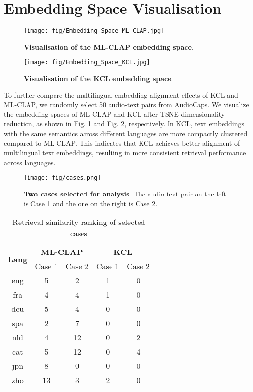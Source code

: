 \section{Embedding Space Visualisation}
\label{Appe:Embedding Space}
\begin{figure}[htbp]
    \centering
    \texttt{[image: fig/Embedding\_Space\_ML-CLAP.jpg]}
    \caption{\textbf{Visualisation of the ML-CLAP embedding space}.}
    \label{Fig:Embedding Space ML-CLAP}
\end{figure}

\begin{figure}[htbp]
    \centering
    \texttt{[image: fig/Embedding\_Space\_KCL.jpg]}
    \caption{\textbf{Visualisation of the KCL embedding space}.}
    \label{Fig:Embedding Space KCL}
\end{figure}

To further compare the multilingual embedding alignment effects of KCL and ML-CLAP, we randomly select 50 audio-text pairs from AudioCaps. We visualize the embedding spaces of ML-CLAP and KCL after TSNE dimensionality reduction, as shown in Fig. \ref{Fig:Embedding Space ML-CLAP} and Fig. \ref{Fig:Embedding Space KCL}, respectively. In KCL, text embeddings with the same semantics across different languages are more compactly clustered compared to ML-CLAP. This indicates that KCL achieves better alignment of multilingual text embeddings, resulting in more consistent retrieval performance across languages.

\begin{figure}[htbp]
    \centering
    \texttt{[image: fig/cases.png]}
    \caption{\textbf{Two cases selected for analysis}. The audio text pair on the left is Case 1 and the one on the right is Case 2.}
    \label{Fig:Cases}
\end{figure}

\begin{table}[ht]
\caption{Retrieval similarity ranking of selected cases}
\small
\centering
\begin{tabular}{c|cc|cc}
\hline
\multirow{2}{*}{\textbf{Lang}} & \multicolumn{2}{c|}{\textbf{ML-CLAP}} & \multicolumn{2}{c}{\textbf{KCL}}\\ \cline{2-5}
& Case 1 & Case 2 & Case 1 & Case 2 \\ \hline
eng & 5 & 2 & 1 & 0\\ 
fra & 4 & 4 & 1 & 0\\ 
deu & 5 & 4 & 0 & 0\\ 
spa & 2 & 7 & 0 & 0\\ 
nld & 4 & 12 & 0 & 2\\ 
cat & 5 & 12 & 0 & 4\\ 
jpn & 8 & 0 & 0 & 0\\ 
zho & 13 & 3 & 2 & 0\\ \hline
\end{tabular}
\label{Tab:Case Rank}
\end{table}

